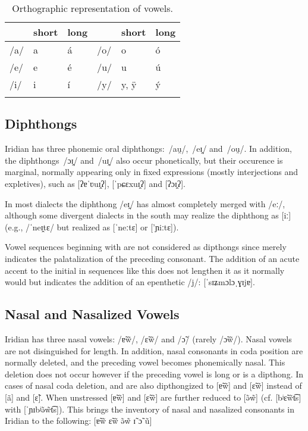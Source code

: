 \begin{table}
	\small
	\caption{Orthographic representation of vowels.}
	\medskip
	\begin{tabularx}{0.7\textwidth}{YYYYYY}
		\toprule
		& {\sc short} & {\sc long} & & {\sc short} & {\sc long}\\
		\midrule
		/a/ & a &á & /o/ & o &\'o \\
		/e/ & e &é & /u/ & u &ú\\
		/i/ & i &í & /y/ & y, \"y &\'y\\
		\bottomrule
		\label{table:vowels-orth}
	\end{tabularx}
\end{table}

\subsection{Diphthongs}
Iridian has three phonemic oral diphthongs: \,/au̯/, \,/eɪ̯/ and \,/ou̯/. In addition, the diphthongs \,/ɔɪ̯/ and \,/uɪ̯/  also occur phonetically, but their occurence is marginal, normally appearing only in fixed expressions (mostly interjections and expletives), such as  [ʔɐˈʋuɪ̯ʔ],  [ˈpɕɛxuɪ̯ʔ] and  [ʔɔɪ̯ʔ].

In most dialects the diphthong /eɪ̯/ has almost completely merged with  /eː/, although some divergent dialects in the south may realize the diphthong as [iː] (e.g.,  /ˈneɪ̯tɛ/ but realized as [ˈneːtɛ] or ['ɲiːtɛ]).

Vowel sequences beginning with  are not considered as dipthongs since  merely indicates the palatalization of the preceding consonant. The addition of an acute accent to the initial  in sequences like this does not lengthen it as it normally would but indicates the addition of an epenthetic /j/:  [ˈsɪʑmɔlɔˌɣɪjɐ].

\subsection{Nasal and Nasalized Vowels}

Iridian has three nasal vowels:  /ɐ̃w̃/,  /ɛ̃w̃/ and  /ɔ̃/ (rarely /ɔ̃w̃/). Nasal vowels are not disinguished for length. In addition, nasal consonants in coda position are normally deleted, and the preceding vowel becomes phonemically nasal. This deletion does not occur however if the preceding vowel is long or is a dipthong. In cases of nasal coda deletion,  and  are also dipthongized to [ɐ̃w̃] and [ɛ̃w̃] instead of [\~a] and [ɛ̃]. When unstressed [ɐ̃w̃] and [ɛ̃w̃] are further reduced to [ə̃w̃] (cf.  [bʲɛ̃w̃t͡s] with  [ˈɲɪbʲə̃w̃t͡s]). This brings the inventory of nasal and nasalized consonants in Iridian to the following: [ɐ̃w̃ ɛ̃w̃ ə̃w̃ ɪ̃ ɔ̃ ũ]

